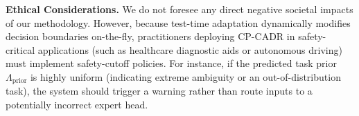 \documentclass{article}
\theoremstyle{plain}
\theoremstyle{definition}
\theoremstyle{remark}
\begin{document}
\textbf{Ethical Considerations.} We do not foresee any direct negative societal impacts of our methodology. However, because test-time adaptation dynamically modifies decision boundaries on-the-fly, practitioners deploying CP-CADR in safety-critical applications (such as healthcare diagnostic aids or autonomous driving) must implement safety-cutoff policies. For instance, if the predicted task prior $\Lambda_{\text{prior}}$ is highly uniform (indicating extreme ambiguity or an out-of-distribution task), the system should trigger a warning rather than route inputs to a potentially incorrect expert head.
\end{document}
